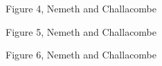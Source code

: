 \documentclass[prl,twocolumn,showpacs,twocolumngrid,superbib]{revtex4}
\begin{document}
{\begin{center}
Figure 4, Nemeth and Challacombe \\[1.cm]
\end{center}

\clearpage

\begin{center}
Figure 5, Nemeth and Challacombe \\[1.cm]
\end{center}

\clearpage

\begin{center}
Figure 6, Nemeth and Challacombe \\[1.cm]
\end{center}

}
\end{document}
